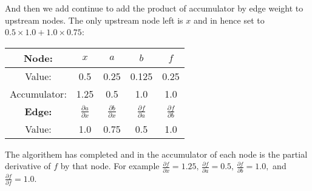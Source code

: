 And then we add continue to add the product of accumulator by edge weight to upstream nodes.
The only upstream node left is $x$ and in hence set to $0.5\times1.0+1.0\times0.75$:
\begin{multicols}{2}
	\columnbreak
	\centering
	\begin{center}
\begin{tabular}{|c|c|c|c|c|}
	\hline
	\bf Node:\phantom{\bigg|} &$x$&$a$&$b$&$f$\\
	\hline
	Value: &0.5&0.25&0.125&0.25\\
	Accumulator: &1.25&0.5&1.0&1.0\\
	\hline
	\hline
	\bf Edge:\phantom{\bigg|} &$\frac{\partial a}{\partial x}$&$\frac{\partial b}{\partial x}$&$\frac{\partial f}{\partial a}$&$\frac{\partial f}{\partial b}$\\
	\hline
	Value: &1.0&0.75&0.5&1.0\\
	\hline
\end{tabular}
	\end{center}
\end{multicols}

The algorithem has completed and in the accumulator of each node is the partial derivative of $f$ by that node.
For example $\frac{\partial f}{\partial x} = 1.25,\,\frac{\partial f}{\partial a} = 0.5,\,\frac{\partial f}{\partial b} = 1.0,$ and $\frac{\partial f}{\partial f} = 1.0$.
